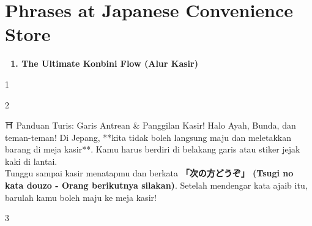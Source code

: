 ﻿\chapter{Phrases at Japanese Convenience Store}

\vspace{1em}
\begin{tcolorbox}[colback=boxframe, colframe=boxframe, rounded corners, boxrule=0pt, arc=3mm, left=2mm, top=2mm, bottom=2mm]
    \Large \bfseries \color{white} 🏪 1. The Ultimate Konbini Flow (Alur Kasir)
\end{tcolorbox}
\vspace{1em}

\begin{convobox}{1}
    \noindent
      
     

    \vspace{1.5em}
\end{convobox}

\begin{convobox}{2}
    \noindent

    \vspace{1.5em}
\end{convobox}

\begin{lessonbox}{⛩️ Panduan Turis: Garis Antrean \& Panggilan Kasir!}
    Halo Ayah, Bunda, dan teman-teman! Di Jepang, **kita tidak boleh langsung maju dan meletakkan barang di meja kasir**. Kamu harus berdiri di belakang garis atau stiker jejak kaki di lantai. \\
    
    Tunggu sampai kasir menatapmu dan berkata \textbf{「次の方どうぞ」 (Tsugi no kata douzo - Orang berikutnya silakan)}. Setelah mendengar kata ajaib itu, barulah kamu boleh maju ke meja kasir!
\end{lessonbox}

\begin{convobox}{3}
    \noindent
     

    \vspace{1.5em}
\end{convobox}

